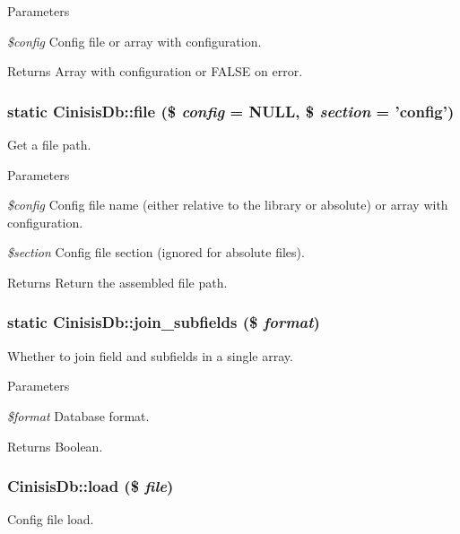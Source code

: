 \begin{DoxyParams}{Parameters}
\item[{\em \$config}]Config file or array with configuration.\end{DoxyParams}
\begin{DoxyReturn}{Returns}
Array with configuration or FALSE on error. 
\end{DoxyReturn}
\hypertarget{classCinisisDb_ac44f1e510c52d21090aab8b903c6ddf5}{
\subsubsection[{file}]{\setlength{\rightskip}{0pt plus 5cm}static CinisisDb::file (\$ {\em config} = {\ttfamily NULL}, \/  \$ {\em section} = {\ttfamily 'config'})}}
\label{classCinisisDb_ac44f1e510c52d21090aab8b903c6ddf5}
Get a file path.


\begin{DoxyParams}{Parameters}
\item[{\em \$config}]Config file name (either relative to the library or absolute) or array with configuration.\item[{\em \$section}]Config file section (ignored for absolute files).\end{DoxyParams}
\begin{DoxyReturn}{Returns}
Return the assembled file path. 
\end{DoxyReturn}
\hypertarget{classCinisisDb_a18c5fa49b8683ed0e80cdf72d360d50a}{
\subsubsection[{join\_\-subfields}]{\setlength{\rightskip}{0pt plus 5cm}static CinisisDb::join\_\-subfields (\$ {\em format})}}
\label{classCinisisDb_a18c5fa49b8683ed0e80cdf72d360d50a}
Whether to join field and subfields in a single array.


\begin{DoxyParams}{Parameters}
\item[{\em \$format}]Database format.\end{DoxyParams}
\begin{DoxyReturn}{Returns}
Boolean. 
\end{DoxyReturn}
\hypertarget{classCinisisDb_a517ae044290df8ccea6b04ad91d19a7f}{
\subsubsection[{load}]{\setlength{\rightskip}{0pt plus 5cm}CinisisDb::load (\$ {\em file})}}
\label{classCinisisDb_a517ae044290df8ccea6b04ad91d19a7f}
Config file load.


